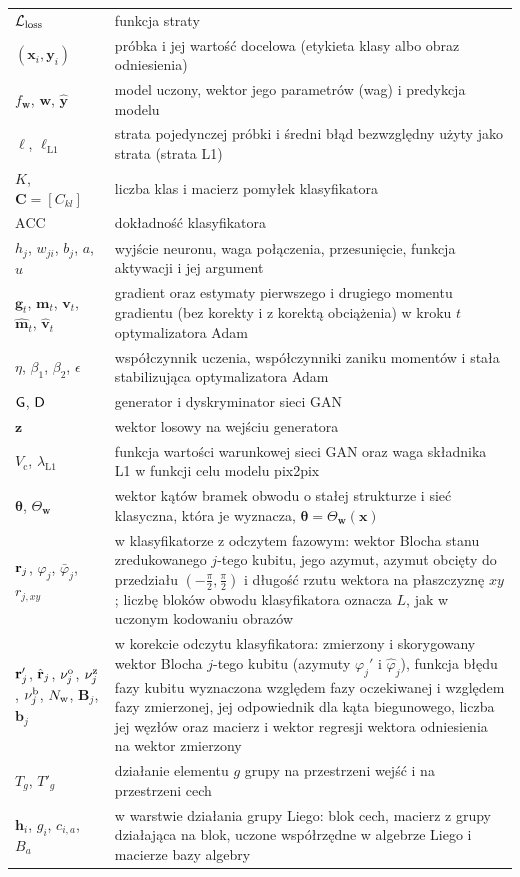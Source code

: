 \begin{longtable}{@{}p{}p{}@{}}
$\mathcal{L}_{\mathrm{loss}}$ & funkcja straty \\
$(\mathbf{x}_i,\mathbf{y}_i)$ & próbka i jej wartość docelowa (etykieta klasy albo obraz odniesienia) \\
$f_{\mathbf{w}}$, $\mathbf{w}$, $\hat{\mathbf{y}}$ & model uczony, wektor jego parametrów (wag) i predykcja modelu \\
$\ell$, $\ell_{\mathrm{L1}}$ & strata pojedynczej próbki i średni błąd bezwzględny użyty jako strata (strata L1) \\
$K$, $\mathbf{C}=[C_{kl}]$ & liczba klas i macierz pomyłek klasyfikatora \\
$\mathrm{ACC}$ & dokładność klasyfikatora \\
$h_j$, $w_{ji}$, $b_j$, $a$, $u$ & wyjście neuronu, waga połączenia, przesunięcie, funkcja aktywacji i jej argument \\
$\mathbf{g}_t$, $\mathbf{m}_t$, $\mathbf{v}_t$, $\hat{\mathbf{m}}_t$, $\hat{\mathbf{v}}_t$ & gradient oraz estymaty pierwszego i drugiego momentu gradientu (bez korekty i z korektą obciążenia) w kroku $t$ optymalizatora Adam \\
$\eta$, $\beta_1$, $\beta_2$, $\epsilon$ & współczynnik uczenia, współczynniki zaniku momentów i stała stabilizująca optymalizatora Adam \\
$\mathsf{G}$, $\mathsf{D}$ & generator i dyskryminator sieci GAN \\
$\mathbf{z}$ & wektor losowy na wejściu generatora \\
$V_{\mathrm{c}}$, $\lambda_{\mathrm{L1}}$ & funkcja wartości warunkowej sieci GAN oraz waga składnika L1 w funkcji celu modelu pix2pix \\
$\boldsymbol{\theta}$, $\Theta_{\mathbf{w}}$ & wektor kątów bramek obwodu o stałej strukturze i sieć klasyczna, która je wyznacza, $\boldsymbol{\theta}=\Theta_{\mathbf{w}}(\mathbf{x})$ \\
$\mathbf{r}_j$, $\varphi_j$, $\bar{\varphi}_j$, $r_{j,xy}$ & w klasyfikatorze z odczytem fazowym: wektor Blocha stanu zredukowanego $j$-tego kubitu, jego azymut, azymut obcięty do przedziału $(-\frac{\pi}{2},\frac{\pi}{2})$ i długość rzutu wektora na płaszczyznę $xy$; liczbę bloków obwodu klasyfikatora oznacza $L$, jak w uczonym kodowaniu obrazów \\
$\mathbf{r}_j'$, $\hat{\mathbf{r}}_j$, $\nu_j^{\mathrm{o}}$, $\nu_j^{\mathrm{z}}$, $\nu_j^{\mathrm{b}}$, $N_{\mathrm{w}}$, $\mathbf{B}_j$, $\mathbf{b}_j$ & w korekcie odczytu klasyfikatora: zmierzony i skorygowany wektor Blocha $j$-tego kubitu (azymuty $\varphi_j'$ i $\hat{\varphi}_j$), funkcja błędu fazy kubitu wyznaczona względem fazy oczekiwanej i względem fazy zmierzonej, jej odpowiednik dla kąta biegunowego, liczba jej węzłów oraz macierz i wektor regresji wektora odniesienia na wektor zmierzony \\
$T_g$, $T'_g$ & działanie elementu $g$ grupy na przestrzeni wejść i na przestrzeni cech \\
$\mathbf{h}_i$, $g_i$, $c_{i,a}$, $B_a$ & w warstwie działania grupy Liego: blok cech, macierz z grupy działająca na blok, uczone współrzędne w algebrze Liego i macierze bazy algebry \\
\bottomrule
\end{longtable}

